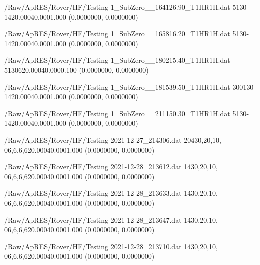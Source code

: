 \hfaprestable
{/Raw/ApRES/Rover/HF/Testing}%
{1\_SubZero\_\_164126.90\_T1HR1H.dat}%
{5}{1}{30}{-14}{20.000}{40.000}{1.000}%
{ (0.0000000, 0.0000000)}%
{}%
{}%

\hfaprestable
{/Raw/ApRES/Rover/HF/Testing}%
{1\_SubZero\_\_165816.20\_T1HR1H.dat}%
{5}{1}{30}{-14}{20.000}{40.000}{1.000}%
{ (0.0000000, 0.0000000)}%
{}%
{}%

\hfaprestable
{/Raw/ApRES/Rover/HF/Testing}%
{1\_SubZero\_\_180215.40\_T1HR1H.dat}%
{5}{1}{30}{6}{20.000}{40.000}{0.100}%
{ (0.0000000, 0.0000000)}%
{}%
{}%

\hfaprestable
{/Raw/ApRES/Rover/HF/Testing}%
{1\_SubZero\_\_181539.50\_T1HR1H.dat}%
{300}{1}{30}{-14}{20.000}{40.000}{1.000}%
{ (0.0000000, 0.0000000)}%
{}%
{}%

\hfaprestable
{/Raw/ApRES/Rover/HF/Testing}%
{1\_SubZero\_\_211150.30\_T1HR1H.dat}%
{5}{1}{30}{-14}{20.000}{40.000}{1.000}%
{ (0.0000000, 0.0000000)}%
{}%
{}%

\hfaprestable
{/Raw/ApRES/Rover/HF/Testing}%
{2021-12-27\_214306.dat}%
{20}{4}{30,20,10, 0}{6,6,6,6}{20.000}{40.000}{1.000}%
{ (0.0000000, 0.0000000)}%
{}%
{}%

\hfaprestable
{/Raw/ApRES/Rover/HF/Testing}%
{2021-12-28\_213612.dat}%
{1}{4}{30,20,10, 0}{6,6,6,6}{20.000}{40.000}{1.000}%
{ (0.0000000, 0.0000000)}%
{}%
{}%

\hfaprestable
{/Raw/ApRES/Rover/HF/Testing}%
{2021-12-28\_213633.dat}%
{1}{4}{30,20,10, 0}{6,6,6,6}{20.000}{40.000}{1.000}%
{ (0.0000000, 0.0000000)}%
{}%
{}%

\hfaprestable
{/Raw/ApRES/Rover/HF/Testing}%
{2021-12-28\_213647.dat}%
{1}{4}{30,20,10, 0}{6,6,6,6}{20.000}{40.000}{1.000}%
{ (0.0000000, 0.0000000)}%
{}%
{}%

\hfaprestable
{/Raw/ApRES/Rover/HF/Testing}%
{2021-12-28\_213710.dat}%
{1}{4}{30,20,10, 0}{6,6,6,6}{20.000}{40.000}{1.000}%
{ (0.0000000, 0.0000000)}%
{}%
{}%

